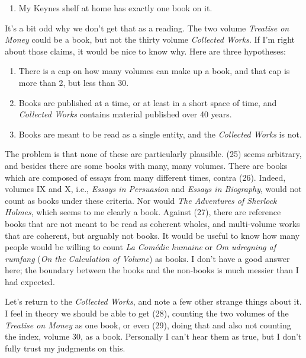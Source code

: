 \documentclass[
  11pt,
  letterpaper,
  DIV=11,
  numbers=noendperiod,
  twoside]{scrartcl}
\newcounter{none} %
\providecommand{\tightlist}{%
  \setlength{\itemsep}{0pt}\setlength{\parskip}{0pt}}
\begin{document}
\begin{enumerate}
\def\labelenumi{(\arabic{enumi})}
\setcounter{enumi}{23}
\tightlist
\item
  My Keynes shelf at home has exactly one book on it.
\end{enumerate}

It's a bit odd why we don't get that as a reading. The two volume
\emph{Treatise on Money} could be a book, but not the thirty volume
\emph{Collected Works}. If I'm right about those claims, it would be
nice to know why. Here are three hypotheses:

\begin{enumerate}
\def\labelenumi{(\arabic{enumi})}
\setcounter{enumi}{24}
\tightlist
\item
  There is a cap on how many volumes can make up a book, and that cap is
  more than 2, but less than 30.
\item
  Books are published at a time, or at least in a short space of time,
  and \emph{Collected Works} contains material published over 40 years.
\item
  Books are meant to be read as a single entity, and the \emph{Collected
  Works} is not.
\end{enumerate}

The problem is that none of these are particularly plausible. (25) seems
arbitrary, and besides there are some books with many, many volumes.
There are books which are composed of essays from many different times,
contra (26). Indeed, volumes IX and X, i.e., \emph{Essays in Persuasion}
and \emph{Essays in Biography}, would not count as books under these
criteria. Nor would \emph{The Adventures of Sherlock Holmes}, which
seems to me clearly a book. Against (27), there are reference books that
are not meant to be read as coherent wholes, and multi-volume works that
are coherent, but arguably not books. It would be useful to know how
many people would be willing to count \emph{La Comédie humaine} or
\emph{Om udregning af rumfang} (\emph{On the Calculation of Volume}) as
books. I don't have a good answer here; the boundary between the books
and the non-books is much messier than I had expected.

Let's return to the \emph{Collected Works}, and note a few other strange
things about it. I feel in theory we should be able to get (28),
counting the two volumes of the \emph{Treatise on Money} as one book, or
even (29), doing that and also not counting the index, volume 30, as a
book. Personally I can't hear them as true, but I don't fully trust my
judgments on this.
\end{document}
